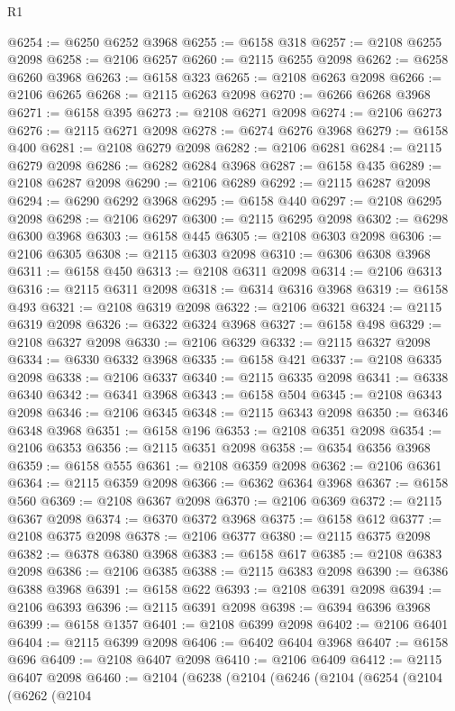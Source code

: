 \begin{lexlean}{R1}
\begin{coremodule}
@6254 := @6250 @6252 @3968
@6255 := @6158 @318
@6257 := @2108 @6255 @2098
@6258 := @2106 @6257
@6260 := @2115 @6255 @2098
@6262 := @6258 @6260 @3968
@6263 := @6158 @323
@6265 := @2108 @6263 @2098
@6266 := @2106 @6265
@6268 := @2115 @6263 @2098
@6270 := @6266 @6268 @3968
@6271 := @6158 @395
@6273 := @2108 @6271 @2098
@6274 := @2106 @6273
@6276 := @2115 @6271 @2098
@6278 := @6274 @6276 @3968
@6279 := @6158 @400
@6281 := @2108 @6279 @2098
@6282 := @2106 @6281
@6284 := @2115 @6279 @2098
@6286 := @6282 @6284 @3968
@6287 := @6158 @435
@6289 := @2108 @6287 @2098
@6290 := @2106 @6289
@6292 := @2115 @6287 @2098
@6294 := @6290 @6292 @3968
@6295 := @6158 @440
@6297 := @2108 @6295 @2098
@6298 := @2106 @6297
@6300 := @2115 @6295 @2098
@6302 := @6298 @6300 @3968
@6303 := @6158 @445
@6305 := @2108 @6303 @2098
@6306 := @2106 @6305
@6308 := @2115 @6303 @2098
@6310 := @6306 @6308 @3968
@6311 := @6158 @450
@6313 := @2108 @6311 @2098
@6314 := @2106 @6313
@6316 := @2115 @6311 @2098
@6318 := @6314 @6316 @3968
@6319 := @6158 @493
@6321 := @2108 @6319 @2098
@6322 := @2106 @6321
@6324 := @2115 @6319 @2098
@6326 := @6322 @6324 @3968
@6327 := @6158 @498
@6329 := @2108 @6327 @2098
@6330 := @2106 @6329
@6332 := @2115 @6327 @2098
@6334 := @6330 @6332 @3968
@6335 := @6158 @421
@6337 := @2108 @6335 @2098
@6338 := @2106 @6337
@6340 := @2115 @6335 @2098
@6341 := @6338 @6340
@6342 := @6341 @3968
@6343 := @6158 @504
@6345 := @2108 @6343 @2098
@6346 := @2106 @6345
@6348 := @2115 @6343 @2098
@6350 := @6346 @6348 @3968
@6351 := @6158 @196
@6353 := @2108 @6351 @2098
@6354 := @2106 @6353
@6356 := @2115 @6351 @2098
@6358 := @6354 @6356 @3968
@6359 := @6158 @555
@6361 := @2108 @6359 @2098
@6362 := @2106 @6361
@6364 := @2115 @6359 @2098
@6366 := @6362 @6364 @3968
@6367 := @6158 @560
@6369 := @2108 @6367 @2098
@6370 := @2106 @6369
@6372 := @2115 @6367 @2098
@6374 := @6370 @6372 @3968
@6375 := @6158 @612
@6377 := @2108 @6375 @2098
@6378 := @2106 @6377
@6380 := @2115 @6375 @2098
@6382 := @6378 @6380 @3968
@6383 := @6158 @617
@6385 := @2108 @6383 @2098
@6386 := @2106 @6385
@6388 := @2115 @6383 @2098
@6390 := @6386 @6388 @3968
@6391 := @6158 @622
@6393 := @2108 @6391 @2098
@6394 := @2106 @6393
@6396 := @2115 @6391 @2098
@6398 := @6394 @6396 @3968
@6399 := @6158 @1357
@6401 := @2108 @6399 @2098
@6402 := @2106 @6401
@6404 := @2115 @6399 @2098
@6406 := @6402 @6404 @3968
@6407 := @6158 @696
@6409 := @2108 @6407 @2098
@6410 := @2106 @6409
@6412 := @2115 @6407 @2098
@6460 := @2104
    (@6238
      (@2104
        (@6246
          (@2104
            (@6254
              (@2104
                (@6262
                  (@2104

\end{coremodule}
\end{lexlean}
